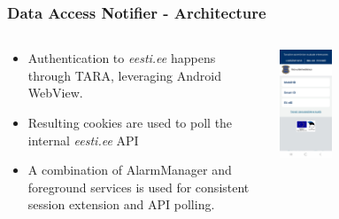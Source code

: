 \documentclass[aspectratio=169,11pt]{beamer}
\begin{document}
\begin{frame}
\frametitle{Data Access Notifier - Architecture}

\begin{columns}[t]
\begin{column}{0.40\textwidth}
\begin{itemize}
    \item Authentication to \textit{eesti.ee} happens through TARA, leveraging Android WebView.
    \item Resulting cookies are used to poll the internal \textit{eesti.ee} API
    \item A combination of AlarmManager and foreground services is used for consistent session extension and API polling.

\end{itemize}
\end{column}

\begin{column}{0.60\textwidth}
\begin{center}
\includegraphics[width=0.3\textwidth]{../english/figures/Screenshot_20250812_212238_Data Access Notifier.jpg}
\end{center}
\end{column}
\end{columns}
\end{frame}
\end{document}
